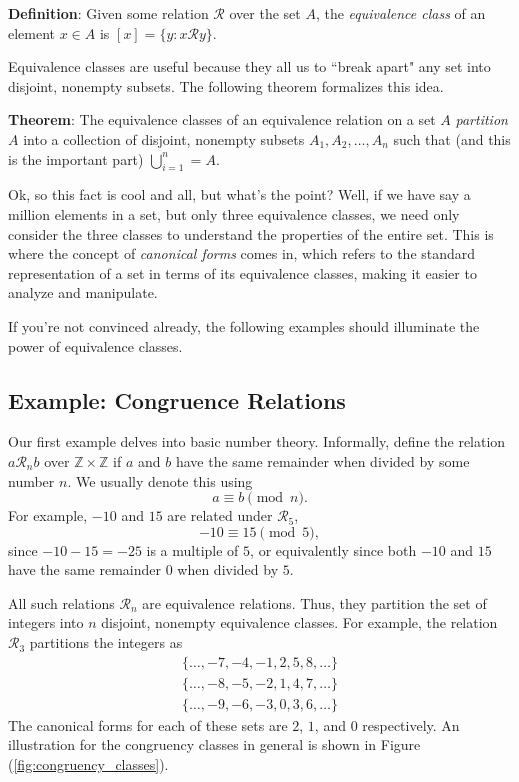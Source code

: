 \documentclass{article}
\begin{document}
    \vspace{2mm}
    \textbf{Definition}: Given some relation $\mathcal{R}$ over the set $A$, the \textit{equivalence class} of an element $x \in A$ is $[x] = \{y : x \mathcal{R} y\}$.

    \vspace{2mm}

    Equivalence classes are useful because they all us to ``break apart" any set into disjoint, nonempty subsets. The following theorem formalizes this idea.

    \begin{tcolorbox}
        \textbf{Theorem}: The equivalence classes of an equivalence relation on a set $A$ \textit{partition} $A$ into a collection of disjoint, nonempty subsets $A_{1}, A_{2}, \dots, A_{n}$ such that (and this is the important part) $\bigcup _{i = 1}^{n} = A$.
    \end{tcolorbox}
    
    \vspace{2mm}
    Ok, so this fact is cool and all, but what's the point? Well, if we have say a million elements in a set, but only three equivalence classes, we need only consider the three classes to understand the properties of the entire set. This is where the concept of \textit{canonical forms} comes in, which refers to the standard representation of a set in terms of its equivalence classes, making it easier to analyze and manipulate.
    
    \vspace{2mm}If you're not convinced already, the following examples should illuminate the power of equivalence classes.

    \subsection*{Example: Congruence Relations}
        Our first example delves into basic number theory. Informally, define the relation $a\mathcal{R}_{n}b$ over $\mathbb{Z} \times \mathbb{Z}$ if $a$ and $b$ have the same remainder when divided by some number $n$. We usually denote this using $$a \equiv b \pmod{n}.$$ For example, $-10$ and $15$ are related under $\mathcal{R}_{5}$, $$-10 \equiv 15 \pmod{5},$$ since $-10 - 15 = -25$ is a multiple of $5$, or equivalently since both $-10$ and $15$ have the same remainder $0$ when divided by $5$.
        
        \vspace{2mm}
        All such relations $\mathcal{R}_{n}$ are equivalence relations. Thus, they partition the set of integers into $n$ disjoint, nonempty equivalence classes. For example, the relation $\mathcal{R}_{3}$ partitions the integers as
        \begin{gather*}
            \{\dots, -7, -4, -1, 2, 5, 8, \dots\} \\
            \{\dots, -8, -5, -2, 1, 4, 7, \dots\} \\
            \{\dots, -9, -6, -3, 0, 3, 6, \dots\}
        \end{gather*}
        The canonical forms for each of these sets are $2$, $1$, and $0$ respectively. An illustration for the congruency classes in general is shown in Figure (\ref{fig:congruency_classes}).
\end{document}
